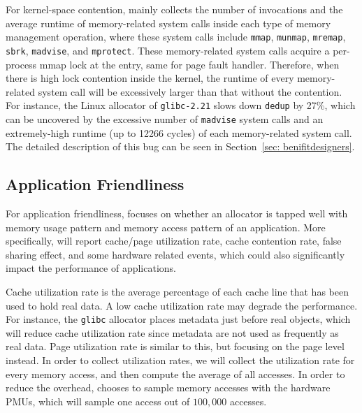 
For kernel-space contention, \MP{} mainly collects the number of invocations and the average runtime of memory-related system calls inside each type of memory management operation, where these system calls include \texttt{mmap}, \texttt{munmap}, \texttt{mremap}, \texttt{sbrk}, \texttt{madvise}, and \texttt{mprotect}. These memory-related system calls  acquire a per-process mmap lock at the entry, same for page fault handler. Therefore, when there is high lock contention inside the kernel, the runtime of every memory-related system call will be excessively larger than that without the contention. For instance, the Linux allocator of \texttt{glibc-2.21} slows down \texttt{dedup} by 27\%, which can be uncovered by the excessive number of \texttt{madvise} system calls and an extremely-high runtime (up to 12266 cycles) of each memory-related system call. The detailed description of this bug can be seen in Section~\ref{sec: benifitdesigners}.  

\subsection{Application Friendliness}
\label{sec:profilefriendliness}

 
For application friendliness, \MP{} focuses on whether an allocator is tapped well with memory usage pattern and memory access pattern of an application.  More specifically, \MP{} will report cache/page utilization rate, cache contention rate, false sharing effect, and some hardware related events, which could also significantly impact the performance of applications. 

Cache utilization rate is the average percentage of each cache line that has been used to hold real data. A low cache utilization rate may degrade the performance. For instance, the \texttt{glibc} allocator places metadata just before real objects, which will reduce cache utilization rate since metadata are not used as frequently as real data. Page utilization rate is similar to this, but focusing on the page level instead. In order to collect  utilization rates, we will collect the utilization rate for every memory access, and then compute the average of all accesses. In order to reduce the overhead, \MP{} chooses to sample memory accesses with the hardware PMUs, which will sample one access out of $100,000$ accesses. 


